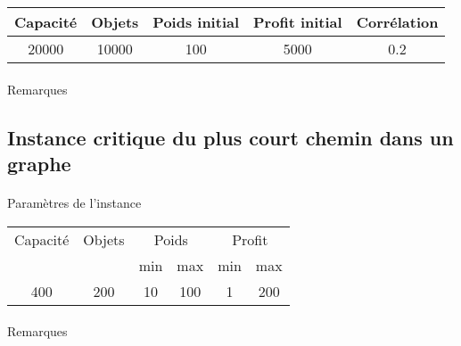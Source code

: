 \documentclass[12pt]{article}
\begin{document}
\begin{tabular}{|c|c|c|c|c|}
\hline
Capacité & Objets & Poids initial & Profit initial & Corrélation \\
\hline
20000 & 10000 & 100 & 5000 & 0.2 \\
\hline
\end{tabular}

\begin{figure}[!h]
\begin{floatrow}
\end{floatrow}
\end{figure}

\paragraph{}Remarques

\subsection{Instance critique du plus court chemin dans un graphe}

\paragraph{}Paramètres de l'instance

\begin{tabular}{|c|c|c|c|c|c|}
	\hline
	Capacité & Objets & \multicolumn{2}{c|}{Poids} & \multicolumn{2}{c|}{Profit} \\
	\cline{3-6}
		& & min & max & min & max \\
	\hline
	400 & 200 & 10 & 100 & 1 & 200 \\
	\hline
\end{tabular}

\begin{figure}[!h]
\begin{floatrow}
\end{floatrow}
\end{figure}

\paragraph{}Remarques
\end{document}
